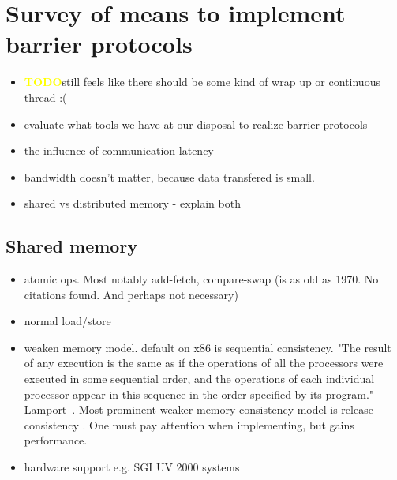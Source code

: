 \documentclass[a4paper, 10pt]{article}
\def \todo{\textbf{\textcolor{yellow}{TODO}}}
\begin{document}
\section{Survey of means to implement barrier protocols}
\begin{itemize}
	\item \todo still feels like there should be some kind of wrap up or continuous thread :(
	\item evaluate what tools we have at our disposal to realize barrier protocols
	\item the influence of communication latency
	\item bandwidth doesn't matter, because data transfered is small.
	\item shared vs distributed memory - explain both
\end{itemize}

\subsection{Shared memory}
\begin{itemize}
	\item atomic ops. Most notably add-fetch, compare-swap (is as old as 1970. No citations found. And perhaps not necessary)
	\item normal load/store
	\item weaken memory model. default on x86 is sequential consistency. "The result of any execution is the same as if the operations of all the processors were executed in some sequential order, and the operations of each individual processor appear in this sequence in the order specified by its program." - Lamport~\cite{sequentialconsistency}. Most prominent weaker memory consistency model is release consistency \cite{gha90}.
		One must pay attention when implementing, but gains performance.
	\item hardware support e.g. SGI UV 2000 systems\cite{sgiuv2000}
\end{itemize}

\end{document}
